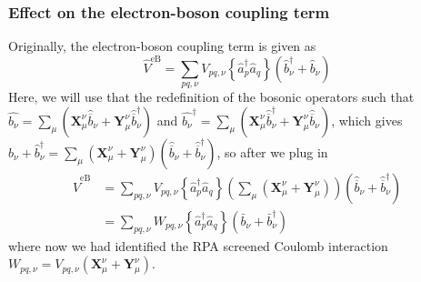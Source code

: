 \subsubsection{Effect on the electron-boson coupling term}
Originally, the electron-boson coupling term is given as
\begin{equation}
\hat{V}^{\mathrm{eB}}=\sum_{p q, \nu} V_{p q, \nu}\left\{\hat{a}_p^{\dagger} \hat{a}_q\right\}\left(\hat{b}_\nu^{\dagger}+\hat{b}_\nu\right)
\end{equation}
Here, we will use that the redefinition of the bosonic operators such that $\hat{b_\nu} = \sum_\mu \left(\mathbf{X}_{\mu}^{\nu} \hat{\overline{b}}_\nu + \mathbf{Y}_{\mu}^{\nu} \hat{\overline{b}}_\nu^{\dagger}\right)$ and $\hat{b_\nu}^\dagger = \sum_\mu \left(\mathbf{X}_{\mu}^{\nu} \hat{\overline{b}}_\nu^\dagger + \mathbf{Y}_{\mu}^{\nu} \hat{\overline{b}}_\nu\right)$, which gives $\hat{b}_\nu + \hat{b}_{\nu}^\dagger = \sum_\mu \left(\mathbf{X}_{\mu}^{\nu} + \mathbf{Y}_{\mu}^{\nu}\right) \left(\hat{\overline{b}}_\nu + \hat{\overline{b}}_\nu^\dagger\right)$, so after we plug in
\begin{align}
\hat{V}^{\mathrm{eB}}&=\sum_{p q, \nu} V_{p q, \nu}\left\{\hat{a}_p^{\dagger} \hat{a}_q\right\}\left(\sum_\mu \left(\mathbf{X}_{\mu}^{\nu}  + \mathbf{Y}_{\mu}^{\nu} \right) \right)\left(\hat{\overline{b}}_\nu + \hat{\overline{b}}_\nu^\dagger\right) \\
&= \sum_{p q, \nu} W_{p q, \nu} \left\{ \hat{a}_p^{\dagger} \hat{a}_q \right\}\left(\bar{b}_\nu+\bar{b}_\nu^{\dagger}\right)
\end{align}
where now we had identified the RPA screened Coulomb interaction $W_{p q, \nu} = V_{p q, \nu} \left(\mathbf{X}_{\mu}^{\nu} + \mathbf{Y}_{\mu}^{\nu}\right)$. 
